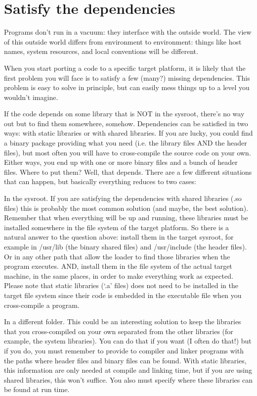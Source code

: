 \chapter{Satisfy the dependencies}\label{tangservice}

Programs don’t run in a vacuum: they interface with the outside world. The view of this outside
world differs from environment to environment: things like host names, system resources, and
local conventions will be different.

When you start porting a code to a specific target platform, it is likely that the first problem you will face is to satisfy a few (many?) missing dependencies.
This problem is easy to solve in principle, but can easily mess things up to a level you wouldn’t imagine.

If the code depends on some library that is NOT in the sysroot, there’s no way out but to find them somewhere, somehow.
Dependencies can be satisfied in two ways: with static libraries or with shared libraries.
If you are lucky, you could find a binary package providing what you need (i.e. the library files AND the header files), but most often you will have to cross-compile the source code on your own.
Either ways, you end up with one or more binary files and a bunch of header files.
Where to put them? Well, that depends.
There are a few different situations that can happen, but basically everything reduces to two cases:

In the sysroot.
If you are satisfying the dependencies with shared libraries (.so files) this is probably the most common solution (and maybe, the best solution).
Remember that when everything will be up and running, these libraries must be installed somewhere in the file system of the target platform.
So there is a natural answer to the question above: install them in the target sysroot, for example in /usr/lib (the binary shared files) and /usr/include (the header files). Or in any other path that allow the loader to find those libraries when the program executes.
AND, install them in the file system of the actual target machine, in the same places, in order to make everything work as expected.
Please note that static libraries (‘.a’ files) does not need to be installed in the target file system since their code is embedded in the executable file when you cross-compile a program.

In a different folder.
This could be an interesting solution to keep the libraries that you cross-compiled on your own separated from the other libraries (for example, the system libraries).
You can do that if you want (I often do that!) but if you do, you must remember to provide to compiler and linker programs with the paths where header files and binary files can be found.
With static libraries, this information are only needed at compile and linking time, but if you are using shared libraries, this won’t suffice.
You also must specify where these libraries can be found at run time.


